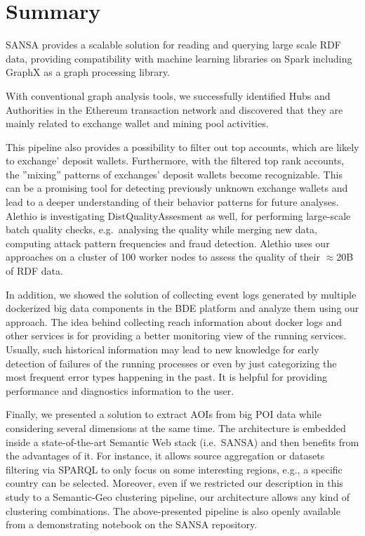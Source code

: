 \section{Summary}
SANSA provides a scalable solution for reading and querying large scale \gls{RDF} data, providing compatibility with machine learning libraries on Spark including GraphX as a graph processing library.

With conventional graph analysis tools, we successfully identified Hubs and Authorities in the Ethereum transaction network and discovered that they are mainly related to exchange wallet and mining pool activities.

This pipeline also provides a possibility to filter out top accounts, which are likely to exchange' deposit wallets. 
Furthermore, with the filtered top rank accounts, the ''mixing'' patterns of exchanges' deposit wallets become recognizable. 
This can be a promising tool for detecting previously unknown exchange wallets and lead to a deeper understanding of their behavior patterns for future analyses.
Alethio is investigating DistQualityAssesment as well, for performing large-scale batch quality checks, e.g.~analysing the quality while merging new data, computing attack pattern frequencies and fraud detection. 
Alethio uses our approaches on a cluster of 100 worker nodes to assess the quality of their $\approx$20B of \gls{RDF} data.

In addition, we showed the solution of collecting event logs generated by multiple dockerized big data components in the BDE platform and analyze them using our approach.
The idea behind collecting reach information about docker logs and other services is for providing a better monitoring view of the running services.
Usually, such historical information may lead to new knowledge for early detection of failures of the running processes or even by just categorizing the most frequent error types happening in the past.
It is helpful for providing performance and diagnostics information to the user.

Finally, we presented a solution to extract \gls{AOI}s from big \gls{POI} data while considering several dimensions at the same time. The architecture is embedded inside a state-of-the-art Semantic Web stack (i.e.~SANSA) and then benefits from the advantages of it. For instance, it allows source aggregation or datasets filtering via \gls{SPARQL} to only focus on some interesting regions, e.g., a specific country can be selected. 
Moreover, even if we restricted our description in this study to a Semantic-Geo clustering pipeline, our architecture allows any kind of clustering combinations.
The above-presented pipeline is also openly available from a demonstrating notebook on the SANSA repository.
